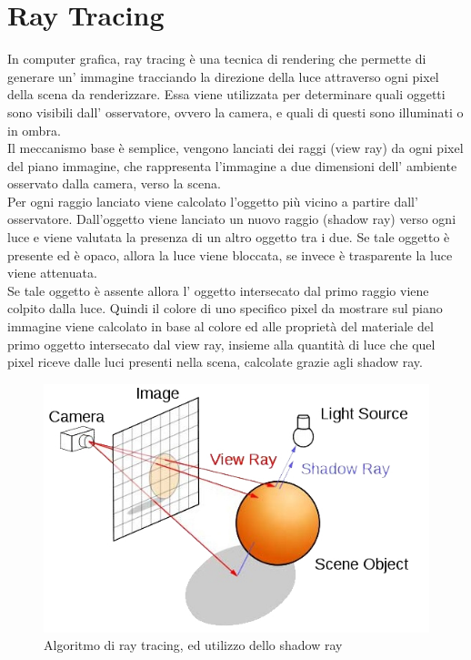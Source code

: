 \section{Ray Tracing}
\label{sec:chapter_stato_arte_ray_tracing}

In computer grafica, ray tracing è una tecnica di rendering che permette di generare un’ immagine tracciando la direzione della luce attraverso ogni pixel della scena da renderizzare.
Essa viene utilizzata per determinare quali oggetti sono visibili dall’ osservatore, ovvero la camera, e quali di questi sono illuminati o in ombra. \cite{rayt1}
\\
Il meccanismo base è semplice, vengono lanciati dei raggi (view ray) da ogni pixel del piano immagine, che rappresenta l’immagine a due dimensioni dell’ ambiente osservato dalla camera, verso la scena.
\\ 
Per ogni raggio lanciato viene calcolato l’oggetto più vicino a partire dall’ osservatore. Dall’oggetto viene lanciato un nuovo raggio (shadow ray) verso ogni luce e viene valutata la presenza di un altro oggetto tra i due.
Se tale oggetto è presente ed è opaco, allora la luce viene bloccata, se invece è trasparente la luce viene attenuata.
\\
Se tale oggetto è assente allora l’ oggetto intersecato dal primo raggio viene colpito dalla luce.
Quindi il colore di uno specifico pixel da mostrare sul piano immagine viene calcolato in base al colore ed alle proprietà del materiale del primo oggetto intersecato dal view ray, insieme alla quantità di luce che quel pixel riceve dalle luci presenti nella scena, calcolate grazie agli shadow ray.
\\
\begin{figure}[htb]
 \centering
 \includegraphics[width=0.7\linewidth]{images/chapter_stato_arte/stato_arte_raytracing_shadowray.jpg}\hfill
 \caption[Ray tracing e shadow ray]{Algoritmo di ray tracing, ed utilizzo dello shadow ray}
 \label{fig:stato_arte_raytracing_shadowray}
\end{figure}

